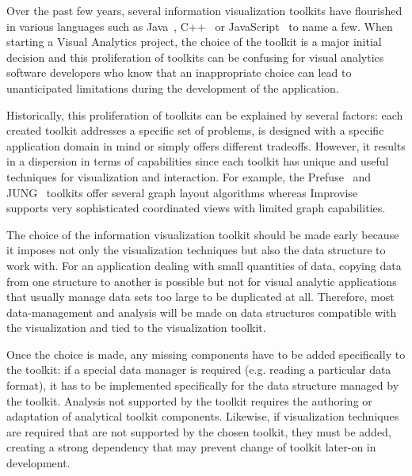 Over the past few years, several information visualization toolkits
have flourished in various languages such as Java~\cite{InfoVis,
  Prefuse, jung2003, Improvise}, C++~\cite{Tulip,ADVIZOR} or
JavaScript~\cite{flare,thejit,Protovis} to name a few.  When starting
a Visual Analytics project, the choice of the toolkit is a major
initial decision and this proliferation of toolkits can be confusing
for visual analytics software developers who know that an
inappropriate choice can lead to unanticipated limitations during the
development of the application.

Historically, this proliferation of toolkits can be explained by
several factors: each created toolkit addresses a specific set of
problems, is designed with a specific application domain in mind or
simply offers different tradeoffs.  However, it results in a dispersion
in terms of capabilities since each toolkit has unique and useful
techniques for visualization and interaction.  For example, the
Prefuse~\cite{Prefuse} and JUNG~\cite{jung2003} toolkits offer several
graph layout algorithms whereas Improvise~\cite{Improvise} supports
very sophisticated coordinated views with limited graph capabilities.

The choice of the information visualization toolkit should be made
early because it imposes not only the visualization techniques but
also the data structure to work with.  For an application dealing with
small quantities of data, copying data from one structure to another
is possible but not for visual analytic applications that usually
manage data sets too large to be duplicated at all.  Therefore, most
data-management and analysis will be made on data structures
compatible with the visualization and tied to the visualization
toolkit.


Once the choice is made, any missing components have to be
added specifically to the toolkit: if a special data manager is
required (e.g. reading a particular data format), it has to be
implemented specifically for the data structure managed by the
toolkit. Analysis not supported by the toolkit requires the authoring
or adaptation of analytical toolkit components. Likewise, if visualization
techniques are required that are not supported by the chosen toolkit,
they must be added, creating a strong dependency that may prevent
change of toolkit later-on in development.

